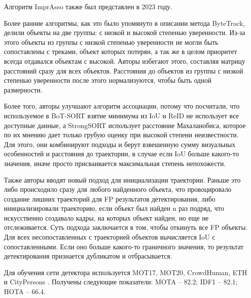 Алгоритм ImprAsso \cite{stadler2023improved} также был представлен в 2023 году. 

Более ранние алгоритмы, как это было упомянуто в описании метода ByteTrack, делили объекты на две группы: с низкой и высокой степенью уверенности. 
Из-за этого объекты из группы с низкой степенью уверенности не могли быть сопоставлены с треками, объект которых потерян, а так же в целом приоритет всегда отдавался объектам с высокой. 
Авторы избегают этого, составляя матрицу расстояний сразу для всех объектов. Расстояния до объектов из группы с низкой степенью уверенности после этого нормализуются, чтобы быть одной размерности. 

Более того, авторы улучшают алгоритм ассоциации, потому что посчитали, что используемое в BoT-SORT взятие минимума из IoU и ReID не использует все доступные данные, а StrongSORT использует расстояние Махаланобиса, которое по их мнению дает только грубую оценку при высокой степени неизвестности.
Для этого, они комбинируют подходы и берут взвешенную сумму визуальных особенностей и расстояния до траектории, в случае если IoU больше какого-то значения, иначе просто присваивается максимальная степень непохожести.

Также авторы вводят новый подход для инициализации траектории. Раньше это либо происходило сразу для любого найденного объекта, что провоцировало создание лишних траекторий для FP результатов детектирования, либо инициализировали траекторию, если объект был найден n раз подряд, что искусственно создавало кадры, на которых объект найден, но еще не отслеживается. 
Суть подхода заключается в том, чтобы откинуть все FP объекты. Для всех несопоставленных с траекторией объектов вычисляется IoU с сопоставленными. Если оно больше какого-то граничного значения, то результат детектирования признается дубликатом и отбрасывается. 

Для обучения сети детектора используется MOT17, MOT20, CrowdHuman, ETH и CityPersons \cite{zhang2017citypersons}. Получены следующие показатели: MOTA -- 82.2; IDF1 -- 82.1; HOTA -- 66.4.